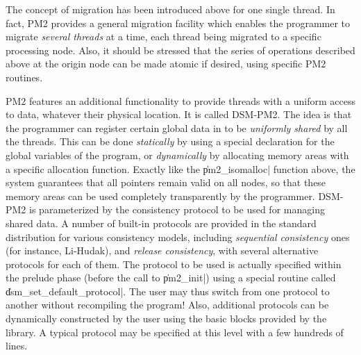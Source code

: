 The concept of migration has been introduced above for one single
thread. In fact, PM2 provides a general migration facility which
enables the programmer to migrate \emph{several threads} at a time,
each thread being migrated to a specific processing node. Also, it
should be stressed that the series of operations described above at
the origin node can be made atomic if desired, using specific PM2
routines.

PM2 features an additional functionality to provide threads with a
uniform access to data, whatever their physical location. It is called
DSM-PM2. The idea is that the programmer can register certain global
data in to be \emph{uniformly shared} by all the threads. This can be
done \emph{statically} by using a special declaration for the global
variables of the program, or \emph{dynamically} by allocating memory
areas with a specific allocation function. Exactly like the
\|pm2_isomalloc| function above, the system guarantees that all
pointers remain valid on all nodes, so that these memory areas can be
used completely transparently by the programmer.  DSM-PM2 is
parameterized by the consistency protocol to be used for managing
shared data. A number of built-in protocols are provided in the
standard distribution for various consistency models, including
\emph{sequential consistency} ones (for instance, Li-Hudak), and
\emph{release consistency}, with several alternative protocols for
each of them. The protocol to be used is actually specified within the
prelude phase (before the call to \|pm2_init|) using a special routine
called \|dsm_set_default_protocol|. The user may thus switch from one
protocol to another without recompiling the program! Also, additional
protocols can be dynamically constructed by the user using the basic
blocks provided by the library. A typical protocol may be specified at
this level with a few hundreds of lines.
